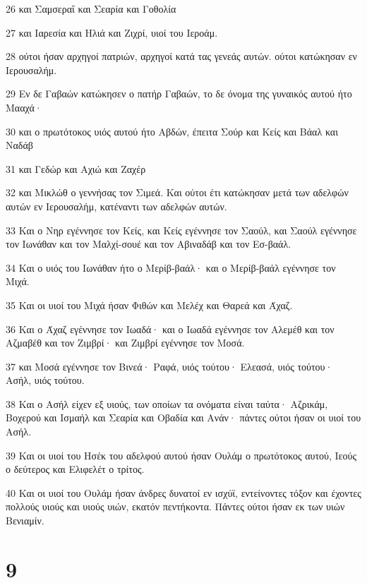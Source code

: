 \par 26 και Σαμσεραΐ και Σεαρία και Γοθολία
\par 27 και Ιαρεσία και Ηλιά και Ζιχρί, υιοί του Ιεροάμ.
\par 28 ούτοι ήσαν αρχηγοί πατριών, αρχηγοί κατά τας γενεάς αυτών. ούτοι κατώκησαν εν Ιερουσαλήμ.
\par 29 Εν δε Γαβαών κατώκησεν ο πατήρ Γαβαών, το δε όνομα της γυναικός αυτού ήτο Μααχά·
\par 30 και ο πρωτότοκος υιός αυτού ήτο Αβδών, έπειτα Σούρ και Κείς και Βάαλ και Ναδάβ
\par 31 και Γεδώρ και Αχιώ και Ζαχέρ
\par 32 και Μικλώθ ο γεννήσας τον Σιμεά. Και ούτοι έτι κατώκησαν μετά των αδελφών αυτών εν Ιερουσαλήμ, κατέναντι των αδελφών αυτών.
\par 33 Και ο Νηρ εγέννησε τον Κείς, και Κείς εγέννησε τον Σαούλ, και Σαούλ εγέννησε τον Ιωνάθαν και τον Μαλχί-σουέ και τον Αβιναδάβ και τον Εσ-βαάλ.
\par 34 Και ο υιός του Ιωνάθαν ήτο ο Μερίβ-βαάλ· και ο Μερίβ-βαάλ εγέννησε τον Μιχά.
\par 35 Και οι υιοί του Μιχά ήσαν Φιθών και Μελέχ και Θαρεά και Άχαζ.
\par 36 Και ο Άχαζ εγέννησε τον Ιωαδά· και ο Ιωαδά εγέννησε τον Αλεμέθ και τον Αζμαβέθ και τον Ζιμβρί· και Ζιμβρί εγέννησε τον Μοσά.
\par 37 και Μοσά εγέννησε τον Βινεά· Ραφά, υιός τούτου· Ελεασά, υιός τούτου· Ασήλ, υιός τούτου.
\par 38 Και ο Ασήλ είχεν εξ υιούς, των οποίων τα ονόματα είναι ταύτα· Αζρικάμ, Βοχερού και Ισμαήλ και Σεαρία και Οβαδία και Ανάν· πάντες ούτοι ήσαν οι υιοί του Ασήλ.
\par 39 Και οι υιοί του Ησέκ του αδελφού αυτού ήσαν Ουλάμ ο πρωτότοκος αυτού, Ιεούς ο δεύτερος και Ελιφελέτ ο τρίτος.
\par 40 Και οι υιοί του Ουλάμ ήσαν άνδρες δυνατοί εν ισχύϊ, εντείνοντες τόξον και έχοντες πολλούς υιούς και υιούς υιών, εκατόν πεντήκοντα. Πάντες ούτοι ήσαν εκ των υιών Βενιαμίν.

\chapter{9}


